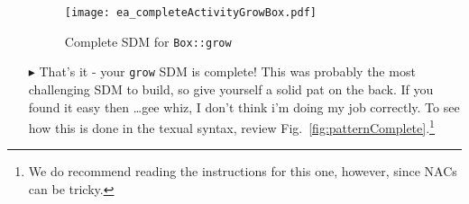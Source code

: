 \begin{itemize}
\begin{figure}[htbp]
\begin{center}
  \texttt{[image: ea\_completeActivityGrowBox.pdf]}
  \caption{Complete SDM for \texttt{Box::grow}}  
  \label{fig:sdm_grow_5}
\end{center}
\end{figure}

\item[$\blacktriangleright$]  That's it - your \texttt{grow} SDM is complete! This was probably the most challenging SDM to build, so give yourself a solid 
pat on the back. If you found it easy then \ldots gee whiz, I don't think i'm doing my job correctly. To see how this is done in the texual syntax, review
Fig.~\ref{fig:patternComplete}.\footnote{We do recommend reading the instructions for this one, however, since NACs can be tricky.}

\end{itemize}
